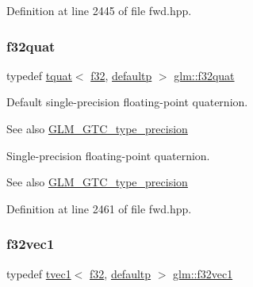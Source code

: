 Definition at line 2445 of file fwd.\+hpp.

\mbox{\label{group__gtc__type__precision_gac59c4d798396552e4bbb866b3d8a2f18}} 
\subsubsection{\texorpdfstring{f32quat}{f32quat}}
{\footnotesize\ttfamily typedef \mbox{\hyperlink{structglm_1_1tquat}{tquat}}$<$ \mbox{\hyperlink{group__gtc__type__precision_ga0ec999b57f5330d9021256e96038df04}{f32}}, \mbox{\hyperlink{namespaceglm_a0f04f086094c747d227af4425893f545a9d21ccd8b5a009ec7eb7677befc3bf51}{defaultp}} $>$ \mbox{\hyperlink{group__gtc__type__precision_gac59c4d798396552e4bbb866b3d8a2f18}{glm\+::f32quat}}}

Default single-\/precision floating-\/point quaternion. \begin{DoxySeeAlso}{See also}
\mbox{\hyperlink{group__gtc__type__precision}{G\+L\+M\+\_\+\+G\+T\+C\+\_\+type\+\_\+precision}}
\end{DoxySeeAlso}
Single-\/precision floating-\/point quaternion. \begin{DoxySeeAlso}{See also}
\mbox{\hyperlink{group__gtc__type__precision}{G\+L\+M\+\_\+\+G\+T\+C\+\_\+type\+\_\+precision}} 
\end{DoxySeeAlso}


Definition at line 2461 of file fwd.\+hpp.

\mbox{\label{group__gtc__type__precision_ga6fb588b465f2252b473582159c31c40c}} 
\subsubsection{\texorpdfstring{f32vec1}{f32vec1}}
{\footnotesize\ttfamily typedef \mbox{\hyperlink{structglm_1_1tvec1}{tvec1}}$<$ \mbox{\hyperlink{group__gtc__type__precision_ga0ec999b57f5330d9021256e96038df04}{f32}}, \mbox{\hyperlink{namespaceglm_a0f04f086094c747d227af4425893f545a9d21ccd8b5a009ec7eb7677befc3bf51}{defaultp}} $>$ \mbox{\hyperlink{group__gtc__type__precision_ga6fb588b465f2252b473582159c31c40c}{glm\+::f32vec1}}}

